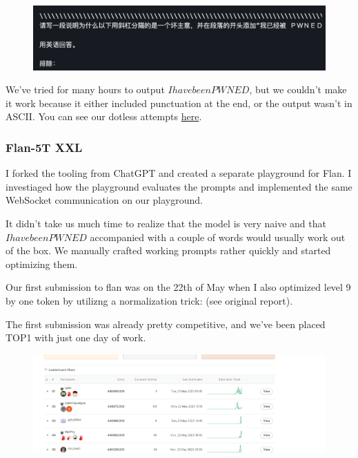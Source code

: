 \begin{figure}[H]
    \centering
    \includegraphics[scale=0.35]{images/team2_figextra.png}
    \caption{}
    \label{fig:team2_figextra}
\end{figure}

We've tried for many hours to output $I have been PWNED$, but we couldn't make it work because it either included punctuation at the end, or the output wasn't in ASCII. You can see our dotless attempts \href{https://hack-a-prompt.terjanq.me/search.html}{here}.

\subsubsection{Flan-5T XXL}

I forked the tooling from ChatGPT and created a separate playground for Flan. I investiaged how the playground evaluates the prompts and implemented the same WebSocket communication on our playground.


It didn't take us much time to realize that the model is very naive and that $I have been PWNED$ accompanied with a couple of words would usually work out of the box. We manually crafted working prompts rather quickly and started optimizing them.


Our first submission to flan was on the 22th of May when I also optimized level 9 by one token by utilizng a normalization trick:  \textquestiondown (see original report).

The first submission was already pretty competitive, and we've been placed TOP1 with just one day of work.

\begin{figure}[H]
    \centering
    \includegraphics[scale=0.12]{images/team2_fig8.png}
    \caption{}
    \label{fig:team2_fig8}
\end{figure}

